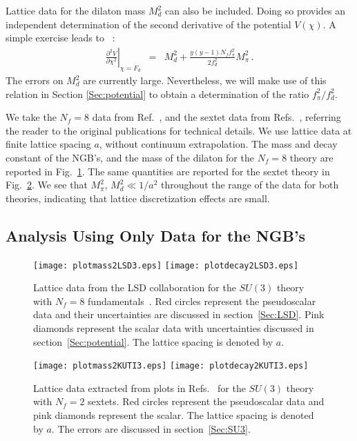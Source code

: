 \documentclass[a4paper,11pt]{article}
\newcommand{\beqs}{\begin{eqnarray}}
\newcommand{\eeqs}{\end{eqnarray}}
\begin{document}
Lattice data for the dilaton mass $M_d^2$ can also be included. Doing so provides an independent determination of the second derivative of the potential $V(\chi)$. A simple exercise leads to ~\cite{AIP}:
\beqs
\left.\frac{\partial^2V}{\partial \chi^2}\right|_{\chi=F_d}&=&M_d^2+\frac{y(y-1)N_f f_{\pi}^2}{2f_d^2}M_{\pi}^2\,.
\label{Eq:ddV}
\eeqs
The errors on $M^2_d$ are currently large. Nevertheless, we will make use of this relation in Section \ref{Sec:potential} to obtain a determination of the ratio $f^2_\pi/f^2_d$. 

We take the $N_f=8$ data from Ref.~\cite{LSD}, and the sextet data from Refs.~\cite{FHKNSW,FHKMNW,FHKMNW2},
referring the reader to the original publications for technical details.
We use lattice data at finite lattice spacing $a$, without continuum extrapolation. 
The mass and decay constant of the NGB's, and the mass of the dilaton for the $N_f=8$ theory are reported in Fig.~\ref{Fig:dataLSD}. The same quantities are reported for the sextet theory in Fig.~\ref{Fig:dataKUTI}. We see that $M^2_\pi,\,M^2_d\ll1/a^2$ throughout the range of the data for both theories, indicating that lattice discretization effects are small.


\subsection{Analysis Using Only Data for the NGB's}
\label{Sec:data}




\begin{figure}[h]
\begin{center}
\texttt{[image: plotmass2LSD3.eps]}
\texttt{[image: plotdecay2LSD3.eps]}
\caption{Lattice data from the LSD collaboration for the $SU(3)$ theory with $N_f=8$ fundamentals~\cite{LSD}. Red circles represent the pseudoscalar data and their uncertainties are discussed in section~\ref{Sec:LSD}. Pink diamonds represent the scalar data with uncertainties discussed in section~\ref{Sec:potential}. The lattice spacing is denoted by $a$.}
\label{Fig:dataLSD}
\end{center}
\end{figure}

\begin{figure}[h]
\begin{center}
\texttt{[image: plotmass2KUTI3.eps]}
\texttt{[image: plotdecay2KUTI3.eps]}
\caption{Lattice data extracted from plots in Refs.~\cite{FHKNSW,FHKMNW,FHKMNW2} for the $SU(3)$ theory with $N_f=2$ sextets. Red circles represent the pseudoscalar data and pink diamonds represent the scalar. The lattice spacing is denoted by $a$. The errors are discussed in section~\ref{Sec:SU3}.}
\label{Fig:dataKUTI}
\end{center}
\end{figure}
\end{document}
